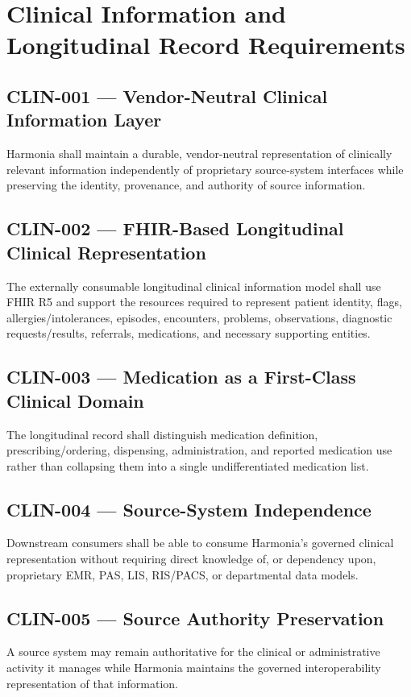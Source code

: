 \section{Clinical Information and Longitudinal Record Requirements}

\subsection{CLIN-001 --- Vendor-Neutral Clinical Information Layer}
Harmonia shall maintain a durable, vendor-neutral representation of clinically relevant information independently of proprietary source-system interfaces while preserving the identity, provenance, and authority of source information.

\subsection{CLIN-002 --- FHIR-Based Longitudinal Clinical Representation}
The externally consumable longitudinal clinical information model shall use FHIR R5 and support the resources required to represent patient identity, flags, allergies/intolerances, episodes, encounters, problems, observations, diagnostic requests/results, referrals, medications, and necessary supporting entities.

\subsection{CLIN-003 --- Medication as a First-Class Clinical Domain}
The longitudinal record shall distinguish medication definition, prescribing/ordering, dispensing, administration, and reported medication use rather than collapsing them into a single undifferentiated medication list.

\subsection{CLIN-004 --- Source-System Independence}
Downstream consumers shall be able to consume Harmonia's governed clinical representation without requiring direct knowledge of, or dependency upon, proprietary EMR, PAS, LIS, RIS/PACS, or departmental data models.

\subsection{CLIN-005 --- Source Authority Preservation}
A source system may remain authoritative for the clinical or administrative activity it manages while Harmonia maintains the governed interoperability representation of that information.

